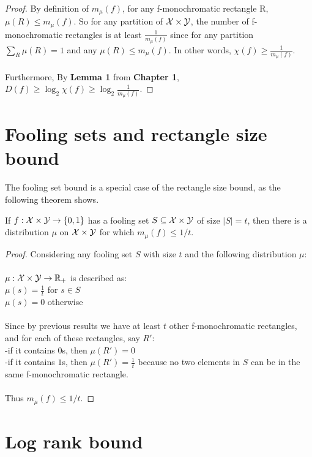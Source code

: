 \begin{proof}
	By definition of $m_\mu(f)$, for any f-monochromatic rectangle R, $\mu(R) \leq m_\mu(f)$. So for any partition of $\mathcal{X} \times \mathcal{Y}$, the number of f-monochromatic rectangles is at least $\frac{1}{m_\mu(f)}$ since for any partition $\sum_{R} \mu(R) = 1$ and any $\mu(R) \leq m_\mu(f)$. In other words, $\chi(f) \ge \frac{1}{m_\mu(f)}$.\\
	\\
	Furthermore, By \textbf{Lemma 1} from \textbf{Chapter 1}, $D(f) \ge \log_2 \chi(f) \ge \log_2 \frac{1}{m_\mu(f)}$. 
\end{proof}


\section{Fooling sets and rectangle size bound}

The fooling set bound is a special case of the rectangle size bound, as the following theorem shows.

\begin{theorem}
	If $f : \mathcal{X} \times \mathcal{Y} \to \{0,1\}$ has a fooling set $S \subseteq \mathcal{X} \times \mathcal{Y}$ of size $|S| = t$, then there is a distribution $\mu$ on $\mathcal{X} \times \mathcal{Y}$ for which $m_\mu(f) \le 1/t$.
\end{theorem}

\begin{proof}
	Considering any fooling set $S$ with size $t$ and the following distribution $\mu$:\\
	\\
	$\mu:\mathcal{X}\times\mathcal{Y} \rightarrow \mathbb{R}_+$ is described as:\\
	$\mu(s)=\frac1t$   for $s\in S$\\
	$\mu(s)=0$ otherwise\\
	\\
	Since by previous results we have at least $t$ other f-monochromatic rectangles, and for each of these rectangles, say $R'$:\\
	-if it contains $0$s, then $\mu(R')=0$\\
	-if it contains $1$s, then $\mu(R')=\frac1t$ because no two elements in $S$ can be in the same f-monochromatic rectangle.\\
	\\
	Thus $m_\mu(f) \le 1/t$.
\end{proof}


\section{Log rank bound}

